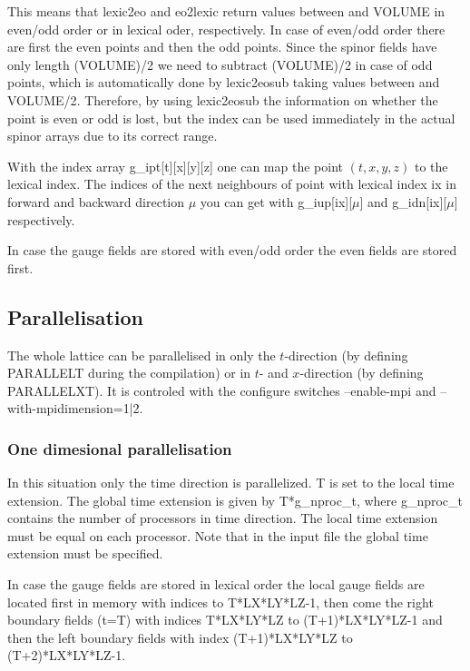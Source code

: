 This means that {\ttfamily lexic2eo} and {\ttfamily eo2lexic} return
values between {} and {\ttfamily VOLUME} in even/odd order
or in lexical oder, respectively. In case of even/odd order there are
first the even points and then the odd points. Since the spinor
fields have only length {\ttfamily (VOLUME)/2} we need to subtract
{\ttfamily (VOLUME)/2} in case of odd points, which is automatically
done by {\ttfamily lexic2eosub} taking values between {} and {\ttfamily VOLUME/2}. Therefore, by using {\ttfamily lexic2eosub}
the information on whether the point is even or odd is lost, but the
index can be used immediately in the actual spinor arrays due to its
correct range.

With the index array {\ttfamily g\_ipt[t][x][y][z]} one can map the
point $(t,x,y,z)$ to the lexical index. The indices of the next
neighbours of point with lexical index {\ttfamily ix} in forward and
backward direction $\mu$ you can get with
{\ttfamily g\_iup[ix][$\mu$]} and {\ttfamily g\_idn[ix][$\mu$]}
respectively.

In case the gauge fields are stored with even/odd order the even
fields are stored first. 

\subsection{Parallelisation}

The whole lattice can be parallelised in only the $t$-direction (by
defining {\ttfamily PARALLELT} during the compilation) or in $t$-
and $x$-direction (by defining {\ttfamily PARALLELXT}).
It is controled with the configure switches {\ttfamily --enable-mpi}
and {\ttfamily --with-mpidimension=1|2}. 

\subsubsection{One dimesional parallelisation}

In this situation only the time direction is parallelized. {\ttfamily
  T} is set to the local time extension. The global time extension is
given by {\ttfamily T*g\_nproc\_t}, where {\ttfamily g\_nproc\_t}
contains the number of processors in time direction. The local time
extension must be equal on each processor. Note that in the input file
the global time extension must be specified. 

In case the gauge fields are stored in lexical order the local gauge
fields are located first in memory with indices { to
  T*LX*LY*LZ-1}, then come the right boundary fields ({\ttfamily t=T})
with indices {\ttfamily T*LX*LY*LZ} to {\ttfamily (T+1)*LX*LY*LZ-1}
and then the left boundary fields with index {\ttfamily
  (T+1)*LX*LY*LZ} to {\ttfamily (T+2)*LX*LY*LZ-1}. 

